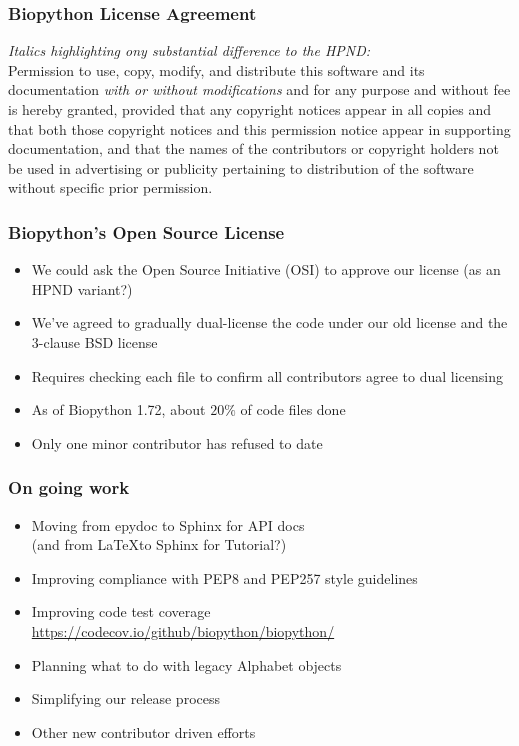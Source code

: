\begin{frame}
\frametitle{Biopython License Agreement}
\textit{Italics highlighting ony substantial difference to the HPND:}
\vspace{6pt} \\

Permission to use, copy, modify, and distribute this software and its documentation \textit{with or without modifications} and for any purpose and without fee is hereby granted, provided that any copyright notices appear in all copies and that both those copyright notices and this permission notice appear in supporting documentation, and that the names of the contributors or copyright holders not be used in advertising or publicity pertaining to distribution of the software without specific prior permission.

\end{frame}

\begin{frame}
\frametitle{Biopython's Open Source License}
\begin{itemize}
\item We could ask the Open Source Initiative (OSI)
    to approve our license (as an HPND variant?)
\item We've agreed to gradually dual-license the code
    under our old license and the 3-clause BSD license
\item Requires checking each file to confirm all
    contributors agree to dual licensing
\item As of Biopython 1.72, about $20\%$ of code files done
\item Only one minor contributor has refused to date
\end{itemize}
\end{frame}


\begin{frame}
\frametitle{On going work}
\begin{itemize}
    \item Moving from epydoc to Sphinx for API docs \\
          (and from \LaTeX to Sphinx for Tutorial?)
    \item Improving compliance with PEP8 and PEP257 style guidelines
    \item Improving code test coverage \url{https://codecov.io/github/biopython/biopython/}
    \item Planning what to do with legacy Alphabet objects
    \item Simplifying our release process
    \item Other new contributor driven efforts
\end{itemize}
\end{frame}


